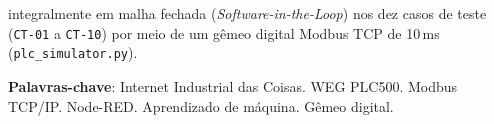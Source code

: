 \begin{resumo}
integralmente em malha fechada (\textit{Software-in-the-Loop}) nos dez casos de teste (\texttt{CT-01} a \texttt{CT-10}) por meio de um gêmeo digital Modbus TCP de 10\,ms (\texttt{plc\_\allowbreak simulator.py}).

\textbf{Palavras-chave}: Internet Industrial das Coisas. WEG PLC500. Modbus TCP/IP. Node-RED. Aprendizado de máquina. Gêmeo digital.
\end{resumo}
